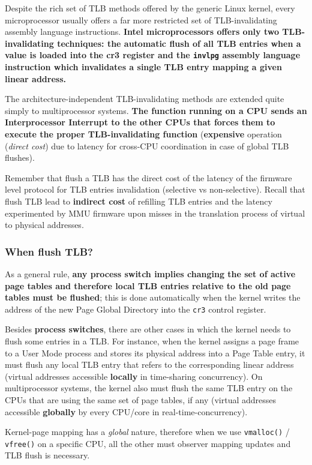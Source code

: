 \documentclass[10pt,a4paper]{article}
\begin{document}
Despite the rich set of TLB methods offered by the generic Linux kernel, every microprocessor usually offers a far more restricted set of TLB-invalidating assembly language instructions. \textbf{Intel microprocessors offers only two TLB-invalidating techniques: the automatic flush of all TLB entries when a value is loaded into the cr3 register and the \texttt{invlpg} assembly language instruction which invalidates a single TLB entry mapping a given linear address.}

The architecture-independent TLB-invalidating methods are extended quite simply to multiprocessor systems. \textbf{The function running on a CPU sends an Interprocessor Interrupt to the other CPUs that forces them to execute the proper TLB-invalidating function} (\textbf{expensive} operation (\textit{direct cost}) due to latency for cross-CPU coordination in case of global TLB flushes).

Remember that flush a TLB has the direct cost of the latency of the firmware level protocol for TLB entries invalidation (selective vs non-selective). Recall that flush TLB lead to \textbf{indirect cost} of refilling TLB entries and the latency experimented by MMU firmware upon misses in the translation process of virtual to physical addresses.

\subsubsection{When flush TLB?}

As a general rule,\textbf{ any process switch implies changing the set of active page tables and therefore local TLB entries relative to the old page tables must be flushed}; this is done automatically when the kernel writes the address of the new Page Global Directory into the \texttt{cr3} control register.

Besides \textbf{process switches}, there are other cases in which the kernel needs to flush some entries in a TLB. For instance, when the kernel assigns a page frame to a User Mode process and stores its physical address into a Page Table entry, it must flush any local TLB entry that refers to the corresponding linear address (virtual addresses accessible \textbf{locally} in time-sharing concurrency). On multiprocessor systems, the kernel also must flush the same TLB entry on the CPUs that are using the same set of page tables, if any (virtual addresses accessible \textbf{globally}  by every CPU/core in real-time-concurrency).

Kernel-page mapping has a \textit{global} nature, therefore when we use \texttt{vmalloc()} / \texttt{vfree()} on a specific CPU, all the other must observer mapping updates and TLB flush is necessary. 
\end{document}
